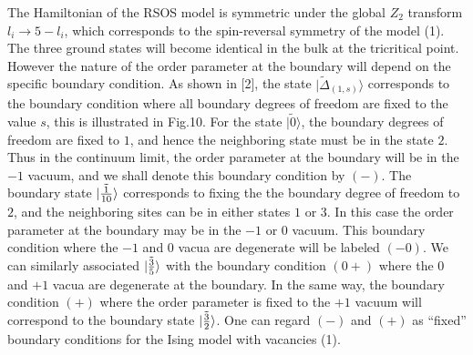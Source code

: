\documentclass[12pt]{article}
\begin{document}
  
The Hamiltonian of the RSOS model is symmetric under
the global $Z_2$ transform $l_i \to 5 - l_i$, which corresponds to the
spin-reversal symmetry of the model (1). The three ground states will
become identical in the bulk at the tricritical point. However the nature
of the order parameter at the boundary will depend on the specific boundary
condition. As shown in [2], the state $|\tilde{\Delta}_{(1,s)}\rangle$ corresponds
to the
boundary condition where all boundary degrees of freedom are fixed to the
value $s$, this is illustrated in Fig.10.
For the state $|\tilde{0}\rangle$, the boundary degrees of freedom are fixed to
$1$, and hence the neighboring state must be in the state $2$. Thus in
the continuum limit, the order parameter at the boundary will be in the $-1$
vacuum, and we shall denote this boundary condition by $(-)$. The boundary
state $|\tilde{1\over10}\rangle$ corresponds to fixing the the boundary degree
of freedom to $2$, and the neighboring sites can be in either states $1$ or
$3$. In this case the order parameter at the boundary may be in the $-1$ or
$0$ vacuum. This boundary condition where the $-1$ and $0$ vacua are
degenerate will be labeled $(-0)$.
We can similarly associated $|\tilde{3\over5}\rangle$ with the boundary condition
$(0+)$ where the $0$ and $+1$ vacua are degenerate at the boundary. In the
same way, the boundary condition $(+)$ where the order parameter is fixed to
the $+1$ vacuum will correspond to the boundary state $|\tilde{3\over2}\rangle$.
One can regard $(-)$ and $(+)$ as ``fixed'' boundary conditions for the
Ising model with vacancies (1).
\end{document}
